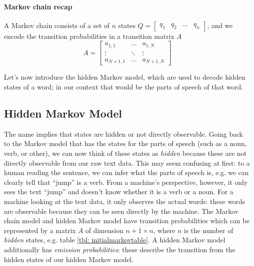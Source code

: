 \documentclass[12pt]{article}
\begin{document}
\vspace{-25pt}
\paragraph{Markov chain recap} A Markov chain consists of a set of $n$ states $Q = \begin{bmatrix} q_1 & q_2 & \ldots & q_n \end{bmatrix}$, and we encode the transition probabilities in a transition matrix $A$
\[
  A = \begin{bmatrix}
    a_{1,1} & \ldots & a_{1,N} \\
    \vdots & \ddots & \vdots \\
    a_{N+1,1} & \ldots & a_{N+1, N}
  \end{bmatrix}
\]

Let's now introduce the hidden Markov model, which are used to decode hidden states of a word; in our context that would be the parts of speech of that word.

\vspace{-10pt}
\subsection{Hidden Markov Model}
The name implies that states are hidden or not directly observable. Going back to the Markov model that has the states for the parts of speech (such as a noun, verb, or other), we can now think of these states as \emph{hidden} because these are not directly observable from our raw text data. This may seem confusing at first: to a human reading the sentence, we can infer what the parts of speech is, e.g. we can clearly tell that ``jump'' is a verb. From a machine's perspective, however, it only sees the text ``jump'' and doesn't know whether it is a verb or a noun. For a machine looking at the text data, it only observes the actual words: these words are observable because they can be seen directly by the machine. The Markov chain model and hidden Markov model have transition probabilities which can be represented by a matrix $A$ of dimension $n+1 \times n$, where $n$ is the number of \emph{hidden} states, e.g. table \ref{tbl: initialmarkovtable}. A hidden Markov model additionally has \emph{emission probabilities}: these describe the transition from the hidden states of our hidden Markov model.
\end{document}
